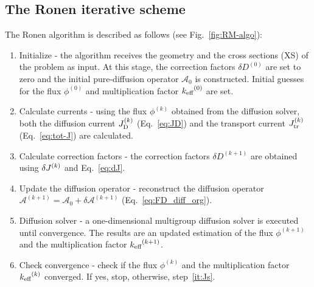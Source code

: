 %
\subsection{The Ronen iterative scheme}
\label{sec:RM-scheme}

The Ronen algorithm is described as follows (see Fig.~\ref{fig:RM-algo}):
\begin{enumerate}
	\item\label{it:init} Initialize - the algorithm receives the geometry and the cross sections (XS) of the problem as input. At this stage, the correction factors $\delta D^{(0)}$ are set to zero and the initial pure-diffusion operator $\mathcal{A}_0$ is constructed. Initial guesses for the flux $\phi^{(0)}$ and multiplication factor ${k_{\textrm{\scriptsize{eff}}}}^{(0)}$ are set.
	\item\label{it:Js} Calculate currents - using the flux $\phi^{(k)}$ obtained from the diffusion solver, both the diffusion current $J_{\textrm{\scriptsize{D}}}^{(k)}$ (Eq.~\ref{eq:JD}) and the transport current $J_{\textrm{\scriptsize{tr}}}^{(k)}$ (Eq.~\ref{eq:tot-J}) are calculated.
	\item\label{it:dD} Calculate correction factors - the correction factors $\delta D^{(k+1)}$ are obtained using $\delta J^{(k)}$ and Eq.~\eqref{eq:dJ}.
	\item\label{it:dA} Update the diffusion operator - reconstruct the diffusion operator $\mathcal{A}^{(k+1)} = \mathcal{A}_0+\delta \mathcal{A}^{(k+1)}$ (Eq.~\ref{eq:FD_diff_org}).
	\item\label{it:DF-solve} Diffusion solver - a one-dimensional multigroup diffusion solver is executed until convergence. The results are an updated estimation of the flux $\phi^{(k+1)}$ and the multiplication factor ${k_{\textrm{\scriptsize{eff}}}}^{(k+1)}$.
	\item\label{it:cvg} Check convergence - check if the flux $\phi^{(k)}$ and the multiplication factor ${k_{\textrm{\scriptsize{eff}}}}^{(k)}$ converged. If yes, stop, otherwise, step~\ref{it:Js}.
\end{enumerate}

